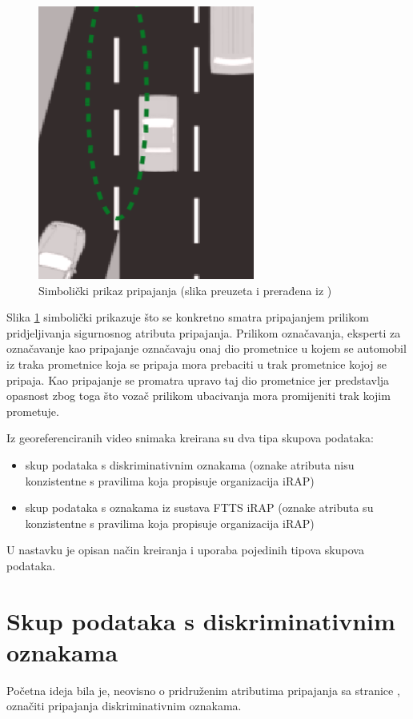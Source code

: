 \documentclass[times, utf8, diplomski, numeric]{fer}
\begin{document}
\begin{figure}[H]
\centering
\includegraphics[scale=0.75]{images/merge_lane.png}
\caption{Simbolički prikaz pripajanja (slika preuzeta i prerađena iz \citep{man:ftts_irap_coding_manual})}
\label{img:merge_lane_symbolic}
\end{figure}

\noindent Slika \ref{img:merge_lane_symbolic} simbolički prikazuje što se konkretno smatra pripajanjem prilikom pridjeljivanja sigurnosnog atributa pripajanja.
Prilikom označavanja, eksperti za označavanje kao pripajanje označavaju onaj dio prometnice u kojem se automobil iz traka prometnice koja se pripaja mora prebaciti u trak prometnice kojoj se pripaja.
Kao pripajanje se promatra upravo taj dio prometnice jer predstavlja opasnost zbog toga što vozač prilikom ubacivanja mora promijeniti trak kojim prometuje.

Iz georeferenciranih video snimaka kreirana su dva tipa skupova podataka:
\begin{itemize}
 \item skup podataka s diskriminativnim oznakama (oznake atributa nisu konzistentne s pravilima koja propisuje organizacija iRAP)
 \item skup podataka s oznakama iz sustava FTTS iRAP (oznake atributa su konzistentne s pravilima koja propisuje organizacija iRAP)
\end{itemize}
U nastavku je opisan način kreiranja i uporaba pojedinih tipova skupova podataka.

\section{Skup podataka s diskriminativnim oznakama}
Početna ideja bila je, neovisno o pridruženim atributima pripajanja sa stranice \citep{url:ftts_irap}, označiti pripajanja diskriminativnim oznakama. 
\end{document}
